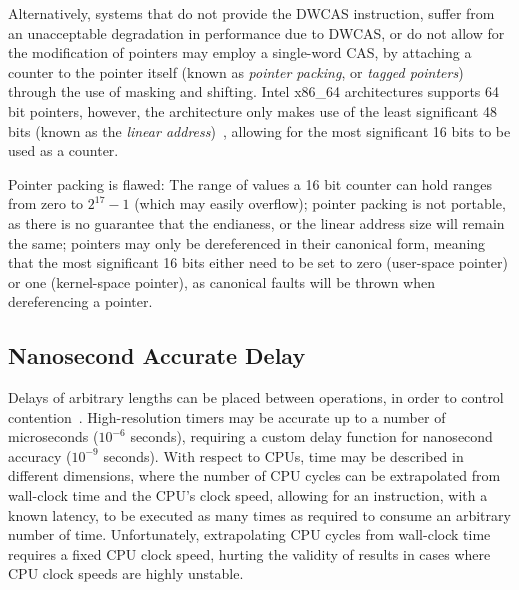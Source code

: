 Alternatively, systems that do not provide the DWCAS instruction, suffer from
an unacceptable degradation in performance due to DWCAS, or do not allow for
the modification of pointers may employ a single-word CAS, by attaching a
counter to the pointer itself (known as \emph{pointer packing}, or \emph{tagged
pointers}) through the use of masking and shifting. Intel x86\_64 architectures supports 64 bit pointers, however, the
architecture only makes use of the least significant 48 bits (known as the
\emph{linear address})~\citep[Section~3.3.7.1]{intel2021system}, allowing for
the most significant 16 bits to be used as a counter.

Pointer packing is flawed: The range of values a 16 bit counter can hold ranges
from zero to $2^{17}-1$ (which may easily overflow); pointer packing is not
portable, as there is no guarantee that the endianess, or the linear address
size will remain the same; pointers may only be dereferenced in their canonical
form, meaning that the most significant 16 bits either need to be set to zero
(user-space pointer) or one (kernel-space pointer), as canonical faults will be
thrown when dereferencing a pointer.

\subsection{Nanosecond Accurate Delay}
Delays of arbitrary lengths can be placed between operations, in order to
control contention~\citep{valois1994queues}. High-resolution timers may be accurate up
to a number of microseconds ($10^{-6}$ seconds), requiring a custom delay
function for nanosecond accuracy ($10^{-9}$ seconds). With respect to CPUs,
time may be described in different dimensions,
where the number of CPU cycles can be extrapolated from wall-clock time and the
CPU's clock speed, allowing for an instruction, with a known latency, to be
executed as many times as required to consume an arbitrary number of
time. Unfortunately, extrapolating CPU cycles from wall-clock time
requires a fixed CPU clock speed, hurting the validity of results in cases
where CPU clock speeds are highly unstable.

